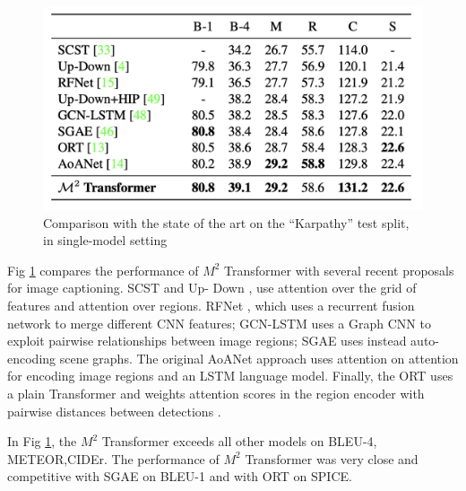 \documentclass[
]{krantz}
\begin{document}
\begin{figure}

{\centering \includegraphics[width=1\linewidth]{figures/02-01/02-02 compare2} 

}

\caption{Comparison with the state of the art on the ``Karpathy'' test split, in single-model setting \citep{cornia2020m2}}\label{fig:compare2}
\end{figure}

Fig \ref{fig:compare2} compares the performance of \(M^2\) Transformer with several recent proposals for image captioning.
SCST \citep{8099614} and Up- Down \citep{8578734}, use attention over the grid of features and attention over regions. RFNet \citep{renet}, which uses a recurrent fusion network to merge different CNN features; GCN-LSTM \citep{GCN-LSTM} uses a Graph CNN to exploit pairwise relationships between image regions; SGAE \citep{Yang_2019_CVPR} uses instead auto-encoding scene graphs. The original AoANet \citep{huang1} approach uses attention on attention for encoding image regions and an LSTM language model. Finally, the ORT \citep{HerdadeKBS19} uses a plain Transformer and weights attention scores in the region encoder with pairwise distances between detections \citep{cornia2020m2}.

In Fig \ref{fig:compare2}, the \(M^2\) Transformer exceeds all other models on BLEU-4, METEOR,CIDEr. The performance of \(M^2\) Transformer was very close and competitive with SGAE on BLEU-1 and with ORT on SPICE.
\end{document}
